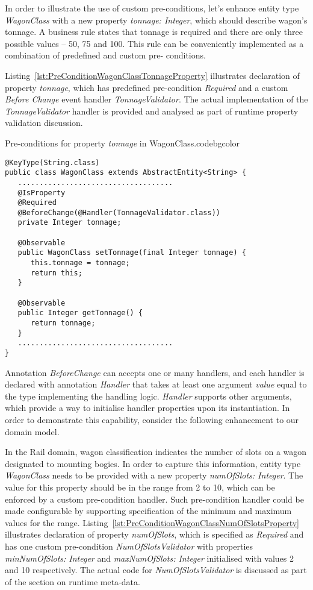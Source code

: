   In order to illustrate the use of custom pre-conditions, let's enhance entity type \emph{WagonClass} with a new property \emph{tonnage: Integer}, which should describe wagon's tonnage.
  A business rule states that tonnage is required and there are only three possible values -- 50, 75 and 100.
  This rule can be conveniently implemented as a combination of predefined and custom pre- conditions.
  
  Listing~\ref{lst:PreConditionWagonClassTonnageProperty} illustrates declaration of property \emph{tonnage}, which has predefined pre-condition \emph{Required} and a custom \emph{Before Change} event handler \emph{TonnageValidator}.
  The actual implementation of the \emph{TonnageValidator} handler is provided and analysed as part of runtime property validation discussion.
  
  \begin{code}{Pre-conditions for property \emph{tonnage} in WagonClass.}{\label{lst:PreConditionWagonClassTonnageProperty}}{codebgcolor}
    \begin{lstlisting}
@KeyType(String.class)
public class WagonClass extends AbstractEntity<String> {  
   ....................................
   @IsProperty
   @Required   
   @BeforeChange(@Handler(TonnageValidator.class))   
   private Integer tonnage;

   @Observable   
   public WagonClass setTonnage(final Integer tonnage) {
      this.tonnage = tonnage;
      return this;
   }

   @Observable   
   public Integer getTonnage() {      
      return tonnage;
   }
   ....................................
}
    \end{lstlisting}
  \end{code}
 
  Annotation \emph{BeforeChange} can accepts one or many handlers, and each handler is declared with annotation \emph{Handler} that takes at least one argument \emph{value} equal to the type implementing the handling logic.
  \emph{Handler} supports other arguments, which provide a way to initialise handler properties upon its instantiation.
  In order to demonstrate this capability, consider the following enhancement to our domain model.
  
  In the Rail domain, wagon classification indicates the number of slots on a wagon designated to mounting bogies.
  In order to capture this information, entity type \emph{WagonClass} needs to be provided with a new property \emph{numOfSlots: Integer}.
  The value for this property should be in the range from 2 to 10, which can be enforced by a custom pre-condition handler.
  Such pre-condition handler could be made configurable by supporting specification of the minimum and maximum values for the range.
  Listing~\ref{lst:PreConditionWagonClassNumOfSlotsProperty} illustrates declaration of property \emph{numOfSlots}, which is specified as \emph{Required} and has one custom pre-condition \emph{NumOfSlotsValidator} with properties \emph{minNumOfSlots: Integer} and \emph{maxNumOfSlots: Integer} initialised with values 2 and 10 respectively.
  The actual code for \emph{NumOfSlotsValidator} is discussed as part of the section on runtime meta-data.

